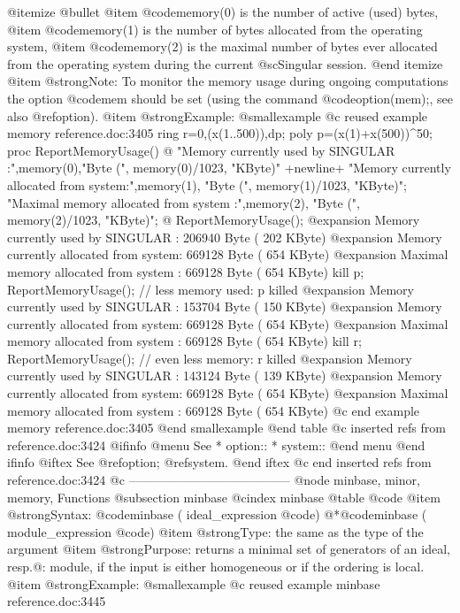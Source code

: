 {@itemize @bullet
@item @code{memory(0)} is the number of active (used) bytes,
@item @code{memory(1)} is the number of bytes allocated from the
operating system,
@item @code{memory(2)} is the maximal number of bytes ever allocated from the
operating system during the current @sc{Singular} session.
@end itemize
@item @strong{Note:}
To monitor the memory usage during ongoing computations the option
@code{mem} should be set (using the command @code{option(mem);}, see
also @ref{option}).
@item @strong{Example:}
@smallexample
@c reused example memory reference.doc:3405 
  ring r=0,(x(1..500)),dp;
  poly p=(x(1)+x(500))^50;
  proc ReportMemoryUsage()
  @{  "Memory currently used by SINGULAR     :",memory(0),"Byte (",
     memory(0)/1023, "KByte)" +newline+
     "Memory currently allocated from system:",memory(1), "Byte (",
     memory(1)/1023, "KByte)";
     "Maximal memory allocated from system  :",memory(2), "Byte (",
     memory(2)/1023, "KByte)";
  @}
  ReportMemoryUsage();
@expansion{} Memory currently used by SINGULAR     : 206940 Byte ( 202 KByte)
@expansion{} Memory currently allocated from system: 669128 Byte ( 654 KByte)
@expansion{} Maximal memory allocated from system  : 669128 Byte ( 654 KByte)
  kill p;
  ReportMemoryUsage(); // less memory used: p killed
@expansion{} Memory currently used by SINGULAR     : 153704 Byte ( 150 KByte)
@expansion{} Memory currently allocated from system: 669128 Byte ( 654 KByte)
@expansion{} Maximal memory allocated from system  : 669128 Byte ( 654 KByte)
  kill r;
  ReportMemoryUsage(); // even less memory: r killed
@expansion{} Memory currently used by SINGULAR     : 143124 Byte ( 139 KByte)
@expansion{} Memory currently allocated from system: 669128 Byte ( 654 KByte)
@expansion{} Maximal memory allocated from system  : 669128 Byte ( 654 KByte)
@c end example memory reference.doc:3405
@end smallexample
@end table
@c inserted refs from reference.doc:3424
@ifinfo
@menu
See
* option::
* system::
@end menu
@end ifinfo
@iftex
See
@ref{option};
@ref{system}.
@end iftex
@c end inserted refs from reference.doc:3424
@c ---------------------------------------
@node minbase, minor, memory, Functions
@subsection minbase
@cindex minbase
@table @code
@item @strong{Syntax:}
@code{minbase (} ideal_expression @code{)}
@*@code{minbase (} module_expression @code{)}
@item @strong{Type:}
the same as the type of the argument
@item @strong{Purpose:}
returns a minimal set of generators of an ideal, resp.@: module, if the
input is
either homogeneous or if the ordering is local.
@item @strong{Example:}
@smallexample
@c reused example minbase reference.doc:3445 
}

